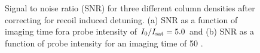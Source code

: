 \documentclass[12pt]{iopart}
\begin{document}
\begin{figure}
\caption{Signal to noise ratio (SNR) for three different column densities after correcting for recoil induced detuning. (a) SNR as a function of imaging time fora probe intensity of $I_0/I_{\rm{sat}}=5.0$ and (b) SNR as a function of probe intensity for an imaging time of 50 \us{}.}
\label{fig:SNR}
\end{figure}
\end{document}
